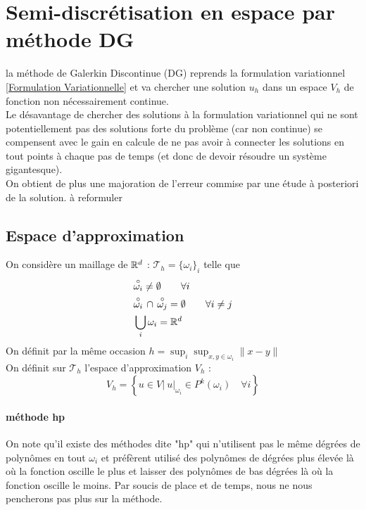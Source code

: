 \documentclass[11pt]{article}%
\begin{document}
\section{Semi-discrétisation en espace par méthode DG}
la méthode de Galerkin Discontinue (DG) reprends la formulation variationnel \eqref{Formulation Variationnelle} et va chercher une solution $u_h$ dans un espace $V_h$ de fonction non nécessairement continue.\\
Le désavantage de chercher des solutions à la formulation variationnel qui ne sont potentiellement pas des solutions forte du problème (car non continue) se compensent avec le gain en calcule de ne pas avoir à connecter les solutions en tout points à chaque pas de temps (et donc de devoir résoudre un système gigantesque). \\ On obtient de plus une majoration de l'erreur commise par une étude à posteriori de la solution.
{\color{red} à reformuler}

\subsection{Espace d'approximation}
On considère un maillage de $\mathbb{R}^d$ : $\mathcal{T}_h = \{\omega_i\}_i$ telle que 
\begin{align}
    & \overset{\circ}{\omega_i} \neq \emptyset \qquad  \forall i\\
    & \overset{\circ}{\omega_i} \,\cap \, \overset{\circ}{\omega_j} = \emptyset  \qquad \forall i\neq j\\
    &\bigcup_i \omega_i = \mathbb{R}^d
\end{align}
On définit par la même occasion $h =\sup_i \sup_{x,y\in \omega_i} \|x-y\|$\\
On définit sur $\mathcal{T}_h$ l'espace d'approximation $V_h$ : 
\begin{equation}
    V_h = \left\{  u\in V | \ u|_{\omega_i} \in P^k(\omega_i) \quad \forall i \right\}
\end{equation}

\paragraph{méthode hp\\}
On note qu'il existe des méthodes dite "hp" qui n'utilisent pas le même dégrées de polynômes en tout $\omega_i$ 
et préfèrent utilisé des polynômes de dégrées plus élevée là où la fonction oscille le plus et laisser des polynômes de bas dégrées 
là où la fonction oscille le moins. Par soucis de place et de temps, nous ne nous pencherons pas plus sur la méthode. \\
\end{document}

